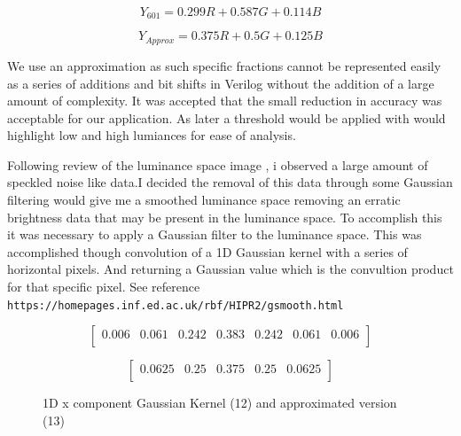 \documentclass[10pt,twoside]{article}
\begin{document}
\begin{minipage}{.49\textwidth}
\begin{equation}
    Y_{601} = 0.299R + 0.587G + 0.114B
\end{equation}
\end{minipage}
\begin{minipage}{.49\textwidth}
\begin{equation}
    Y_{Approx} = 0.375R + 0.5G + 0.125B
\end{equation}
\end{minipage}

We use an approximation as such specific fractions cannot be represented easily as a series of additions and bit shifts in Verilog  without the addition of a large amount of complexity. It was accepted that the small reduction in accuracy was acceptable for our application. As later a threshold would be applied with would highlight low and high lumiances for ease of analysis. 

Following review of the luminance space image , i observed a large amount of speckled noise like data.I decided the removal of this data through some Gaussian filtering would give me a smoothed luminance space removing an erratic brightness data that may be present in the luminance space. To accomplish this it was necessary to apply a Gaussian filter to the luminance space. This was accomplished though convolution of a 1D Gaussian kernel with a series of horizontal pixels. And returning a Gaussian value which is the convultion product for that specific pixel. See reference \verb|https://homepages.inf.ed.ac.uk/rbf/HIPR2/gsmooth.html| 

\begin{figure}[hbt]
    \begin{minipage}{.55\textwidth}
    \begin{equation}
        \begin{bmatrix}
        0.006 & 0.061 & 0.242 & 0.383 & 0.242  & 0.061  & 0.006 \\
    \end{bmatrix}
    \end{equation}
    \end{minipage}
    \begin{minipage}{.39\textwidth}
    \begin{equation}
        \begin{bmatrix}
        0.0625  & 0.25 & 0.375 & 0.25  & 0.0625 \\
        \end{bmatrix}
    \end{equation}
    \end{minipage}
    \caption{1D x component Gaussian Kernel (12)  and  approximated version (13)}
\end{figure}
\end{document}
